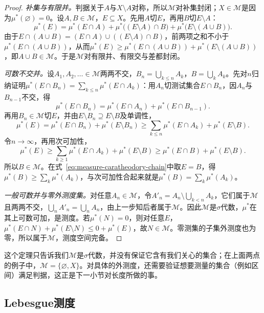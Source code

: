 \begin{proof}
\emph{补集与有限并。}判据关于$A$与$X\setminus A$对称，所以$\mathcal M$对补集封闭；$X\in\mathcal M$是因为$\mu^*(\varnothing)=0$。设$A,B\in\mathcal M$，$E\subseteq X$。先用$A$切$E$，再用$B$切$E\setminus A$：
\[
 \mu^*(E)=\mu^*(E\cap A)+\mu^*\bigl((E\setminus A)\cap B\bigr)+\mu^*\bigl(E\setminus(A\cup B)\bigr).
\]
由于$E\cap(A\cup B)=(E\cap A)\cup((E\setminus A)\cap B)$，前两项之和不小于$\mu^*(E\cap(A\cup B))$，从而$\mu^*(E)\ge\mu^*(E\cap(A\cup B))+\mu^*(E\setminus(A\cup B))$，即$A\cup B\in\mathcal M$。于是$\mathcal M$对有限并、有限交与差都封闭。

\emph{可数不交并。}设$A_1,A_2,\dots\in\mathcal M$两两不交，$B_n=\bigcup_{k\le n}A_k$，$B=\bigcup_kA_k$。先对$n$归纳证明$\mu^*(E\cap B_n)=\sum_{k\le n}\mu^*(E\cap A_k)$：用$A_n$切测试集合$E\cap B_n$，因$A_n$与$B_{n-1}$不交，得
\[
 \mu^*(E\cap B_n)=\mu^*(E\cap A_n)+\mu^*(E\cap B_{n-1}).
\]
再用$B_n\in\mathcal M$切$E$，并由$E\setminus B_n\supseteq E\setminus B$及单调性，
\[
 \mu^*(E)=\mu^*(E\cap B_n)+\mu^*(E\setminus B_n)\ge\sum_{k\le n}\mu^*(E\cap A_k)+\mu^*(E\setminus B).
\]
令$n\to\infty$，再用次可加性，
\begin{equation}
 \mu^*(E)\ge\sum_{k\ge1}\mu^*(E\cap A_k)+\mu^*(E\setminus B)\ge\mu^*(E\cap B)+\mu^*(E\setminus B).
 \label{eq:measure-caratheodory-chain}
\end{equation}
所以$B\in\mathcal M$。在式~\eqref{eq:measure-caratheodory-chain}中取$E=B$，得$\mu^*(B)\ge\sum_k\mu^*(A_k)$，与次可加性合起来就是$\mu^*(B)=\sum_k\mu^*(A_k)$。

\emph{一般可数并与零外测度集。}对任意$A_n\in\mathcal M$，令$A'_n=A_n\setminus\bigcup_{k<n}A_k$，它们属于$\mathcal M$且两两不交，$\bigcup_nA'_n=\bigcup_nA_n$，由上一步知后者属于$\mathcal M$。因此$\mathcal M$是$\sigma$代数，$\mu^*$在其上可数可加，是测度。若$\mu^*(N)=0$，则对任意$E$，$\mu^*(E\cap N)+\mu^*(E\setminus N)\le0+\mu^*(E)$，故$N\in\mathcal M$。零测集的子集外测度也为零，所以属于$\mathcal M$，测度空间完备。
\end{proof}

这个定理只告诉我们$\mathcal M$是$\sigma$代数，并没有保证它含有我们关心的集合；在上面两点的例子中，$\mathcal M=\{\varnothing,X\}$。对具体的外测度，还需要验证想要测量的集合（例如区间）满足判据，这正是下一小节对长度所做的事。

\subsection{Lebesgue测度}
\label{sec:measure-lebesgue}

